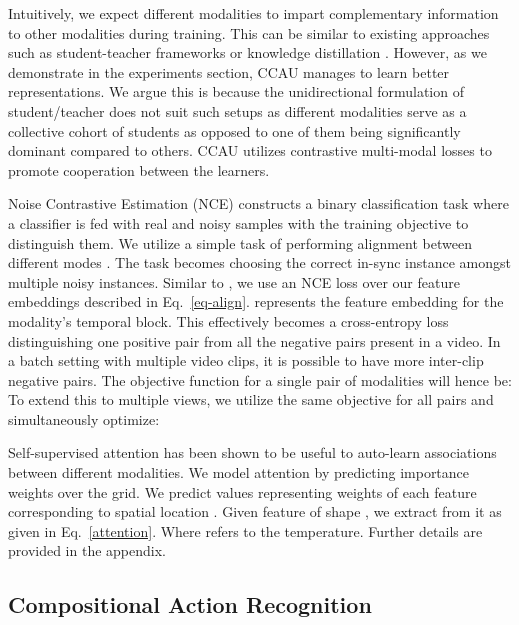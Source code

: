 \documentclass[final]{cvpr}
\begin{document}
Intuitively, we expect different modalities to impart complementary information to other modalities during training. This can be similar to existing approaches such as student-teacher frameworks or knowledge distillation \cite{hinton2015distilling, kong2019mmact}. However, as we demonstrate in the experiments section, CCAU manages to learn better representations. We argue this is because the unidirectional formulation of student/teacher does not suit such setups as different modalities serve as a collective cohort of students as opposed to one of them being significantly dominant compared to others. CCAU utilizes contrastive multi-modal losses to promote cooperation between the learners.

Noise Contrastive Estimation (NCE) \cite{gutmann2010noise, mnih2013learning, oord2018representation} constructs a binary classification task where a classifier is fed with real and noisy samples with the training objective to distinguish them. We utilize a simple task of performing alignment between different modes . The task becomes choosing the correct in-sync instance amongst multiple noisy instances. Similar to \cite{cmc}, we use an NCE loss over our feature embeddings  described in Eq.~\eqref{eq-align}.  represents the feature embedding for the  modality's  temporal block. This effectively becomes a cross-entropy loss distinguishing one positive pair from all the negative pairs present in a video. In a batch setting with multiple video clips, it is possible to have more inter-clip negative pairs.  The objective function for a single pair of modalities will hence be:
{\small }
To extend this to multiple views, we utilize the same objective for all pairs and simultaneously optimize: 
 

Self-supervised attention \cite{multisensory2018} has been shown to be useful to auto-learn associations between different modalities. We model attention by predicting importance weights over the grid. We predict  values  representing weights of each feature corresponding to spatial location . Given feature  of shape , we extract  from it as given in Eq.~\eqref{attention}. Where  refers to the temperature. Further details are provided in the appendix.



\subsection{Compositional Action Recognition}

\label{compose}
\end{document}
